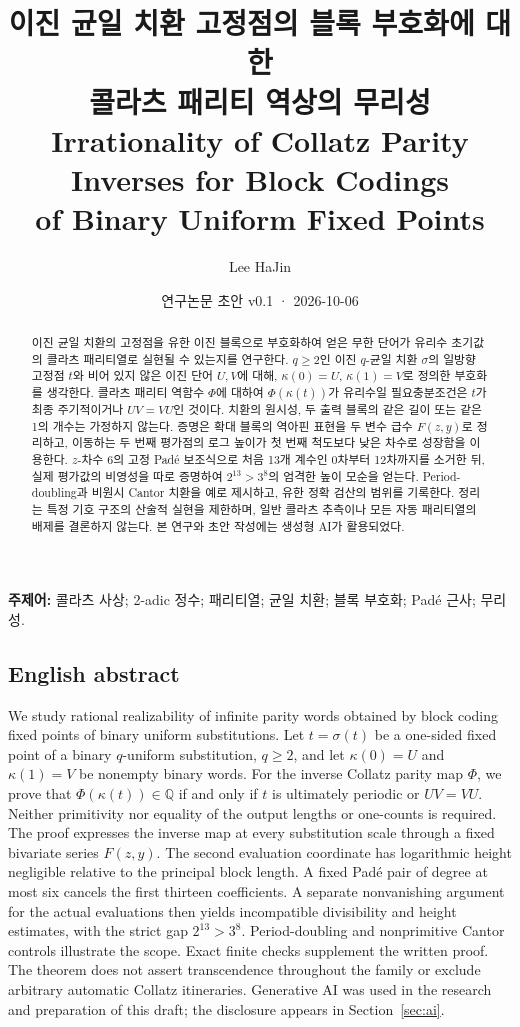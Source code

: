 \documentclass[11pt,a4paper]{article}
\title{\vspace{-1em}\textbf{이진 균일 치환 고정점의 블록 부호화에 대한\\콜라츠 패리티 역상의 무리성}\\[0.65em]
\large Irrationality of Collatz Parity Inverses for Block Codings\\of Binary Uniform Fixed Points}
\author{Lee HaJin}
\date{연구논문 초안 v0.1 · 2026-10-06}
\theoremstyle{koreanplain}
\newcommand{\Q}{\mathbb Q}
\begin{document}
\maketitle

\begin{abstract}
이진 균일 치환의 고정점을 유한 이진 블록으로 부호화하여 얻은 무한 단어가 유리수 초기값의 콜라츠 패리티열로 실현될 수 있는지를 연구한다. $q\ge2$인 이진 $q$-균일 치환 $\sigma$의 일방향 고정점 $t$와 비어 있지 않은 이진 단어 $U,V$에 대해, $\kappa(0)=U$, $\kappa(1)=V$로 정의한 부호화를 생각한다. 콜라츠 패리티 역함수 $\Phi$에 대하여 $\Phi(\kappa(t))$가 유리수일 필요충분조건은 $t$가 최종 주기적이거나 $UV=VU$인 것이다. 치환의 원시성, 두 출력 블록의 같은 길이 또는 같은 1의 개수는 가정하지 않는다. 증명은 확대 블록의 역아핀 표현을 두 변수 급수 $F(z,y)$로 정리하고, 이동하는 두 번째 평가점의 로그 높이가 첫 번째 척도보다 낮은 차수로 성장함을 이용한다. $z$-차수 6의 고정 Padé 보조식으로 처음 13개 계수인 0차부터 12차까지를 소거한 뒤, 실제 평가값의 비영성을 따로 증명하여 $2^{13}>3^8$의 엄격한 높이 모순을 얻는다. Period-doubling과 비원시 Cantor 치환을 예로 제시하고, 유한 정확 검산의 범위를 기록한다. 정리는 특정 기호 구조의 산술적 실현을 제한하며, 일반 콜라츠 추측이나 모든 자동 패리티열의 배제를 결론하지 않는다. 본 연구와 초안 작성에는 생성형 AI가 활용되었다.
\end{abstract}

\noindent\textbf{주제어:} 콜라츠 사상; 2-adic 정수; 패리티열; 균일 치환; 블록 부호화; Padé 근사; 무리성.

\subsection*{English abstract}
We study rational realizability of infinite parity words obtained by block coding fixed points of binary uniform substitutions. Let $t=\sigma(t)$ be a one-sided fixed point of a binary $q$-uniform substitution, $q\ge2$, and let $\kappa(0)=U$ and $\kappa(1)=V$ be nonempty binary words. For the inverse Collatz parity map $\Phi$, we prove that $\Phi(\kappa(t))\in\Q$ if and only if $t$ is ultimately periodic or $UV=VU$. Neither primitivity nor equality of the output lengths or one-counts is required. The proof expresses the inverse map at every substitution scale through a fixed bivariate series $F(z,y)$. The second evaluation coordinate has logarithmic height negligible relative to the principal block length. A fixed Padé pair of degree at most six cancels the first thirteen coefficients. A separate nonvanishing argument for the actual evaluations then yields incompatible divisibility and height estimates, with the strict gap $2^{13}>3^8$. Period-doubling and nonprimitive Cantor controls illustrate the scope. Exact finite checks supplement the written proof. The theorem does not assert transcendence throughout the family or exclude arbitrary automatic Collatz itineraries. Generative AI was used in the research and preparation of this draft; the disclosure appears in Section~\ref{sec:ai}.
\end{document}
